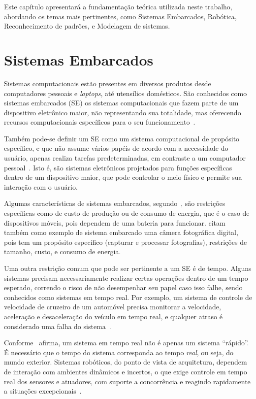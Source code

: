 Este capítulo apresentará a fundamentação teórica utilizada neste trabalho, abordando os temas mais pertinentes, como Sistemas Embarcados, Robótica, Reconhecimento de padrões, e Modelagem de sistemas.

\section{Sistemas Embarcados}\label{sec:embarcados}

Sistemas computacionais estão presentes em diversos produtos desde computadores pessoais e \textit{laptops}, até utensílios domésticos. São conhecidos como sistemas embarcados (SE) os sistemas computacionais que fazem parte de um dispositivo eletrônico maior, não representando sua totalidade, mas oferecendo recursos computacionais específicos para o seu funcionamento~\cite{vahid:2002}.

Também pode-se definir um SE como um sistema computacional de propósito específico, e que não assume vários papéis de acordo com a necessidade do usuário, apenas realiza tarefas predeterminadas, em contraste a um computador pessoal~\cite{heath:2002}. Isto é, são sistemas eletrônicos projetados para funções específicas dentro de um dispositivo maior, que pode controlar o meio físico e permite sua interação com o usuário.

Algumas características de sistemas embarcados, segundo~, são restrições específicas como de custo de produção ou de consumo de energia, que é o caso de dispositivos móveis, pois dependem de uma bateria para funcionar.  citam também como exemplo de sistema embarcado uma câmera fotográfica digital, pois tem um propósito específico (capturar e processar fotografias), restrições de tamanho, custo, e consumo de energia.

Uma outra restrição comum que pode ser pertinente a um SE é de tempo. Alguns sistemas precisam necessariamente realizar certas operações dentro de um tempo esperado, correndo o risco de não desempenhar seu papel caso isso falhe, sendo conhecidos como sistemas em tempo real. Por exemplo, um sistema de controle de velocidade de cruzeiro de um automóvel precisa monitorar a velocidade, aceleração e desaceleração do veículo em tempo real, e qualquer atraso é considerado uma falha do sistema~\cite{vahid:2002}.

Conforme~ afirma, um sistema em tempo real não é apenas um sistema ``rápido''. É necessário que o tempo do sistema corresponda ao tempo \textit{real}, ou seja, do mundo exterior. Sistemas robóticos, do ponto de vista de arquitetura, dependem de interação com ambientes dinâmicos e incertos, o que exige controle em tempo real dos sensores e atuadores, com suporte a concorrência e reagindo rapidamente a situações excepcionais~\cite{siciliano:2008springer}.

